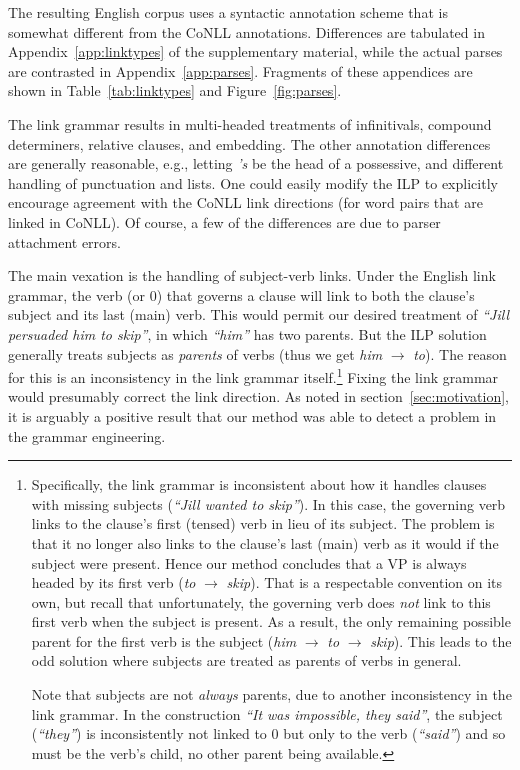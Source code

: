 \documentclass[a4paper,11pt]{article}
\begin{document}
The resulting English corpus uses a syntactic annotation scheme that is somewhat different from the CoNLL annotations.  Differences are tabulated in
Appendix~\ref{app:linktypes} of the supplementary material, while the actual parses are contrasted in Appendix~\ref{app:parses}.  Fragments of these appendices are shown in Table~\ref{tab:linktypes} and Figure~\ref{fig:parses}.

The link grammar results in multi-headed treatments of infinitivals, compound determiners, relative clauses, and embedding.  The other annotation differences are generally reasonable, e.g., letting {\em 's} be the head of a possessive, and different handling of punctuation and lists.  One could easily modify the ILP to explicitly encourage agreement with the CoNLL link directions (for word pairs that are linked in CoNLL).  Of course, a few of the differences are due to parser attachment errors.

The main vexation is the handling of subject-verb links.  Under the English link grammar, the verb (or 0) that governs a clause will link to both the clause's subject and its last (main) verb.  This would permit our desired treatment of {\em ``Jill persuaded him to skip''}, in which {\em ``him''} has two parents.  But the ILP solution generally treats subjects as {\em parents} of verbs (thus we get {\em him} $\rightarrow$ {\em to}).  The reason for this is an inconsistency in the link grammar itself.\footnote{Specifically, the link grammar is inconsistent about how it handles clauses with missing subjects ({\em ``Jill wanted to skip''}).  In this case, the governing verb links to the clause's first (tensed) verb in lieu of its subject.  The problem is that it no longer also links to the clause's last (main) verb as it would if the subject were present.  Hence our method concludes that a VP is always headed by its first verb ({\em to} $\rightarrow$ {\em skip}).  That is a respectable convention on its own, but recall that unfortunately, the governing verb does {\em not} link to this first verb when the subject is present.  As a result, the only remaining possible parent for the first verb is the subject ({\em him} $\rightarrow$ {\em to} $\rightarrow$ {\em skip}).  This leads to the odd solution where subjects are treated as parents of verbs in general.  

Note that subjects are not {\em always} parents, due to another inconsistency in the link grammar.  In the construction {\em ``It was impossible, they said''}, the subject ({\em ``they''}) is inconsistently not linked to 0 but only to the verb ({\em ``said''}) and so must be the verb's child, no other parent being available.}
Fixing the link grammar would presumably correct the link direction.  As noted in section~\ref{sec:motivation}, it is arguably a positive result that our method was able to detect a problem in the grammar engineering.
\end{document}
